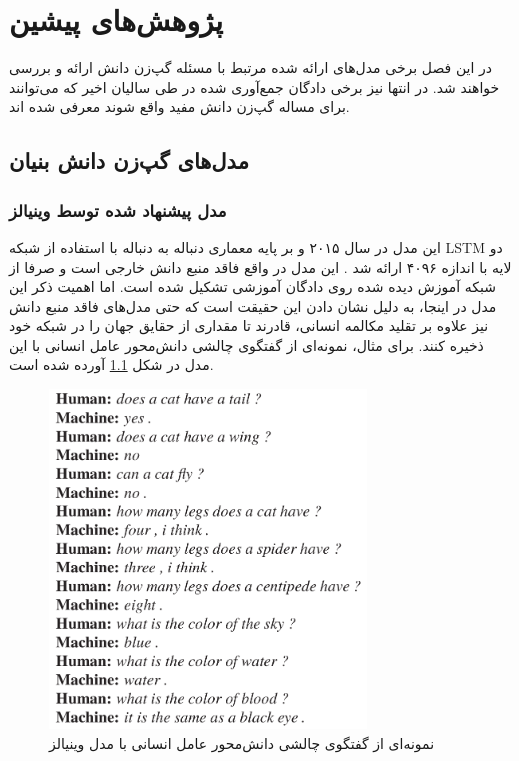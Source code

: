 \chapter{پژوهش‌های پیشین}\label{chap2}
\minitoc

در این فصل برخی مدل‌های ارائه شده مرتبط با مسئله گپ‌زن دانش  ارائه و بررسی خواهند شد. در انتها نیز برخی دادگان جمع‌آوری شده در طی سالیان اخیر که می‌توانند برای مساله گپ‌زن دانش مفید واقع شوند معرفی شده اند.

\section{مدل‌های گپ‌زن دانش بنیان}\label{chap2:intro}

\subsection{مدل پیشنهاد شده توسط وینیالز}

این مدل در سال ۲۰۱۵ و بر پایه معماری دنباله به دنباله با استفاده از شبکه LSTM 
دو لایه با اندازه 
۴۰۹۶
ارائه شد
\cite{A_Neural_Conversational_Model}.
این مدل در واقع فاقد منبع دانش خارجی است و صرفا از شبکه آموزش دیده شده روی دادگان آموزشی تشکیل شده است. اما اهمیت ذکر این مدل در اینجا، به دلیل نشان دادن این حقیقت است که حتی مدل‌های فاقد منبع دانش نیز  علاوه بر تقلید 
 مکالمه انسانی، قادرند تا مقداری از حقایق جهان را در شبکه خود ذخیره کنند.
 برای مثال،‌ نمونه‌ای از گفتگوی چالشی دانش‌محور عامل انسانی با این مدل در شکل
 \ref{fig:chap2:Vinyals1}
 آورده شده است.

\begin{figure}[h]
	\centering
	\includegraphics[width=0.75\textwidth]{images/chap2/Vinyals1.png}
	\caption{
		نمونه‌‌ای از گفتگوی چالشی دانش‌محور عامل انسانی با مدل وینیالز
		\cite{A_Neural_Conversational_Model} 
	}
	\label{fig:chap2:Vinyals1}
\end{figure}

